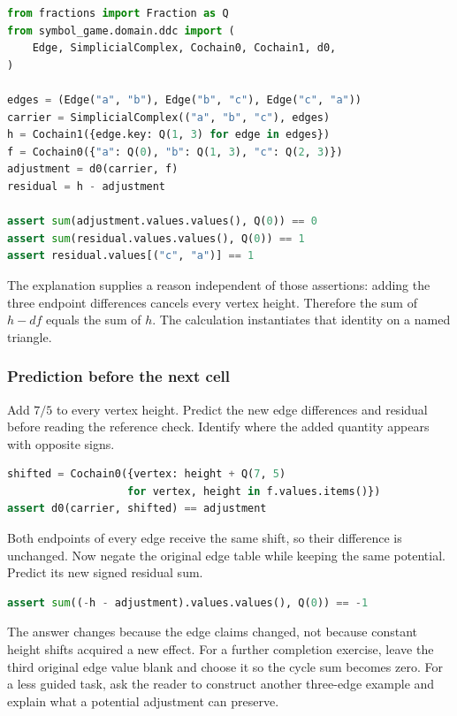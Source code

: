 \documentclass[
  11pt,
]{article}
\begin{document}
\begin{lstlisting}[language=Python]
from fractions import Fraction as Q
from symbol_game.domain.ddc import (
    Edge, SimplicialComplex, Cochain0, Cochain1, d0,
)

edges = (Edge("a", "b"), Edge("b", "c"), Edge("c", "a"))
carrier = SimplicialComplex(("a", "b", "c"), edges)
h = Cochain1({edge.key: Q(1, 3) for edge in edges})
f = Cochain0({"a": Q(0), "b": Q(1, 3), "c": Q(2, 3)})
adjustment = d0(carrier, f)
residual = h - adjustment

assert sum(adjustment.values.values(), Q(0)) == 0
assert sum(residual.values.values(), Q(0)) == 1
assert residual.values[("c", "a")] == 1
\end{lstlisting}

The explanation supplies a reason independent of those assertions:
adding the three endpoint differences cancels every vertex height.
Therefore the sum of \(h-df\) equals the sum of \(h\). The calculation
instantiates that identity on a named triangle.

\hypertarget{prediction-before-the-next-cell}{%
\subsubsection{Prediction before the next
cell}\label{prediction-before-the-next-cell}}

Add \(7/5\) to every vertex height. Predict the new edge differences and
residual before reading the reference check. Identify where the added
quantity appears with opposite signs.

\begin{lstlisting}[language=Python]
shifted = Cochain0({vertex: height + Q(7, 5)
                   for vertex, height in f.values.items()})
assert d0(carrier, shifted) == adjustment
\end{lstlisting}

Both endpoints of every edge receive the same shift, so their difference
is unchanged. Now negate the original edge table while keeping the same
potential. Predict its new signed residual sum.

\begin{lstlisting}[language=Python]
assert sum((-h - adjustment).values.values(), Q(0)) == -1
\end{lstlisting}

The answer changes because the edge claims changed, not because constant
height shifts acquired a new effect. For a further completion exercise,
leave the third original edge value blank and choose it so the cycle sum
becomes zero. For a less guided task, ask the reader to construct
another three-edge example and explain what a potential adjustment can
preserve.
\end{document}

